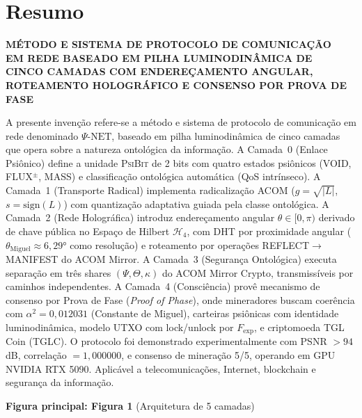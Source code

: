 \documentclass[12pt,a4paper]{article}
\newcommand{\alphaii}{\alpha^2}
\newcommand{\Fexp}{F_{\text{exp}}}
\newcommand{\thetaM}{\theta_{\text{Miguel}}}
\newcommand{\Hfour}{\mathcal{H}_4}
\newcommand{\PsiBit}{\textsc{PsiBit}}
\newcommand{\PsiNet}{\Psi\text{-NET}}
\begin{document}
\newpage
\section{Resumo}

\begin{center}
{\large\bfseries MÉTODO E SISTEMA DE PROTOCOLO DE COMUNICAÇÃO\\
EM REDE BASEADO EM PILHA LUMINODINÂMICA DE\\
CINCO CAMADAS COM ENDEREÇAMENTO ANGULAR,\\
ROTEAMENTO HOLOGRÁFICO E CONSENSO POR PROVA DE FASE}
\end{center}

\vspace{0.5cm}

A presente invenção refere-se a método e sistema de protocolo de
comunicação em rede denominado $\PsiNet$, baseado em pilha
luminodinâmica de cinco camadas que opera sobre a natureza
ontológica da informação. A Camada~0 (Enlace Psiônico) define
a unidade \PsiBit{} de 2 bits com quatro estados psiônicos
(VOID, FLUX$^\pm$, MASS) e classificação ontológica automática
(QoS intrínseco). A Camada~1 (Transporte Radical) implementa
radicalização ACOM ($g = \sqrt{|L|}$, $s = \text{sign}(L)$)
com quantização adaptativa guiada pela classe ontológica. A
Camada~2 (Rede Holográfica) introduz endereçamento angular
$\theta \in [0, \pi)$ derivado de chave pública no Espaço de
Hilbert $\Hfour$, com DHT por proximidade angular ($\thetaM
\approx 6{,}29°$ como resolução) e roteamento por operações
REFLECT$\to$MANIFEST do ACOM Mirror. A Camada~3 (Segurança
Ontológica) executa separação em três shares $(\Psi, \Theta,
\kappa)$ do ACOM Mirror Crypto, transmissíveis por caminhos
independentes. A Camada~4 (Consciência) provê mecanismo de
consenso por Prova de Fase (\textit{Proof of Phase}), onde
mineradores buscam coerência com $\alphaii = 0{,}012031$
(Constante de Miguel), carteiras psiônicas com identidade
luminodinâmica, modelo UTXO com lock/unlock por $\Fexp$, e
criptomoeda TGL Coin (TGLC). O protocolo foi demonstrado
experimentalmente com PSNR $> 94$ dB, correlação $= 1{,}000000$,
e consenso de mineração 5/5, operando em GPU NVIDIA RTX 5090.
Aplicável a telecomunicações, Internet, blockchain e segurança
da informação.

\vspace{0.5cm}
\textbf{Figura principal: Figura 1} (Arquitetura de 5 camadas)
\end{document}
